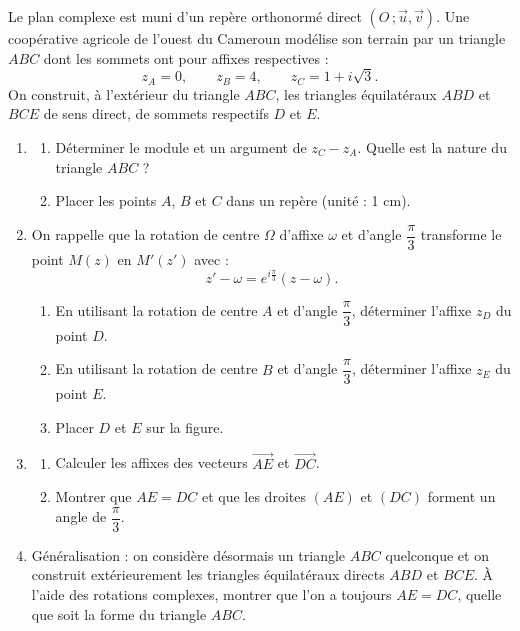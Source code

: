 \documentclass[11pt]{article}
\begin{document}
\begin{exercice}
Le plan complexe est muni d'un repère orthonormé direct $(O\,;\vec{u},\vec{v})$. Une coopérative agricole de l'ouest du Cameroun modélise son terrain par un triangle $ABC$ dont les sommets ont pour affixes respectives :
\[ z_A = 0, \qquad z_B = 4, \qquad z_C = 1 + i\sqrt{3}. \]
On construit, à l'extérieur du triangle $ABC$, les triangles équilatéraux $ABD$ et $BCE$ de sens direct, de sommets respectifs $D$ et $E$.
\begin{enumerate}
\item \begin{enumerate}
\item Déterminer le module et un argument de $z_C - z_A$. Quelle est la nature du triangle $ABC$ ?
\item Placer les points $A$, $B$ et $C$ dans un repère (unité : 1 cm).
\end{enumerate}
\item On rappelle que la rotation de centre $\Omega$ d'affixe $\omega$ et d'angle $\dfrac{\pi}{3}$ transforme le point $M(z)$ en $M'(z')$ avec :
\[ z' - \omega = e^{i\frac{\pi}{3}}(z - \omega). \]
\begin{enumerate}
\item En utilisant la rotation de centre $A$ et d'angle $\dfrac{\pi}{3}$, déterminer l'affixe $z_D$ du point $D$.
\item En utilisant la rotation de centre $B$ et d'angle $\dfrac{\pi}{3}$, déterminer l'affixe $z_E$ du point $E$.
\item Placer $D$ et $E$ sur la figure.
\end{enumerate}
\item \begin{enumerate}
\item Calculer les affixes des vecteurs $\overrightarrow{AE}$ et $\overrightarrow{DC}$.
\item Montrer que $AE = DC$ et que les droites $(AE)$ et $(DC)$ forment un angle de $\dfrac{\pi}{3}$.
\end{enumerate}
\item Généralisation : on considère désormais un triangle $ABC$ quelconque et on construit extérieurement les triangles équilatéraux directs $ABD$ et $BCE$. À l'aide des rotations complexes, montrer que l'on a toujours $AE = DC$, quelle que soit la forme du triangle $ABC$.
\end{enumerate}
\end{exercice}
\end{document}
